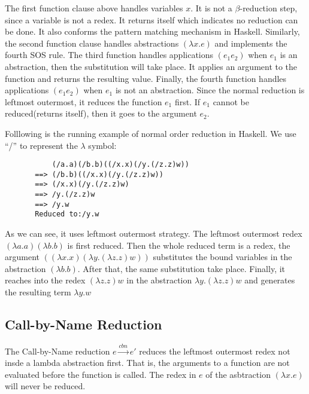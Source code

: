 The first function clause above handles variables $x$. It is not a $\beta$-reduction step, since a variable is not a redex. It returns itself which indicates no reduction can be done. It also conforms the pattern matching mechanism in Haskell. Similarly, the second function clause handles abstractions $(\lambda x.e)$ and implements the fourth SOS rule. The third function handles applications $(e_1e_2)$ when $e_1$ is an abstraction, then the substitution will take place. It applies an argument to the function and returns the resulting value. Finally, the fourth function handles  applications $(e_1e_2)$ when $e_1$ is not an abstraction. Since the normal reduction is leftmost outermost, it reduces the function $e_1$ first. If $e_1$ cannot be reduced(returns itself), then it goes to the argument $e_2$. 


Folllowing is the running example of normal order reduction in Haskell. We use ``/'' to represent the $\lambda$ symbol:

\begin{verbatim}
           (/a.a)(/b.b)((/x.x)(/y.(/z.z)w))
       ==> (/b.b)((/x.x)(/y.(/z.z)w))
       ==> (/x.x)(/y.(/z.z)w)
       ==> /y.(/z.z)w
       ==> /y.w
       Reduced to:/y.w
\end{verbatim}


As we can see, it uses leftmost outermost strategy. The leftmost outermost redex $(\lambda a.a)(\lambda b.b)$ is first reduced. Then the whole reduced term is a redex, the argument $((\lambda x.x)(\lambda y.(\lambda z.z)w))$ substitutes the bound variables in the abstraction $(\lambda b.b)$. After that, the same substitution take place. Finally, it reaches into the redex $(\lambda z.z)w$ in the abstraction $\lambda y.(\lambda z.z)w$ and generates the resulting term $\lambda y.w$


\subsection{Call-by-Name Reduction}{\label{subsec:cbn}}

The Call-by-Name reduction $e\xrightarrow{cbn} e'$ reduces the leftmost outermost redex not insde a lambda abstraction first. That is, the arguments to a function are not evaluated before the function is called. The redex in $e$ of the asbtraction $(\lambda x.e)$ will never be reduced. 


